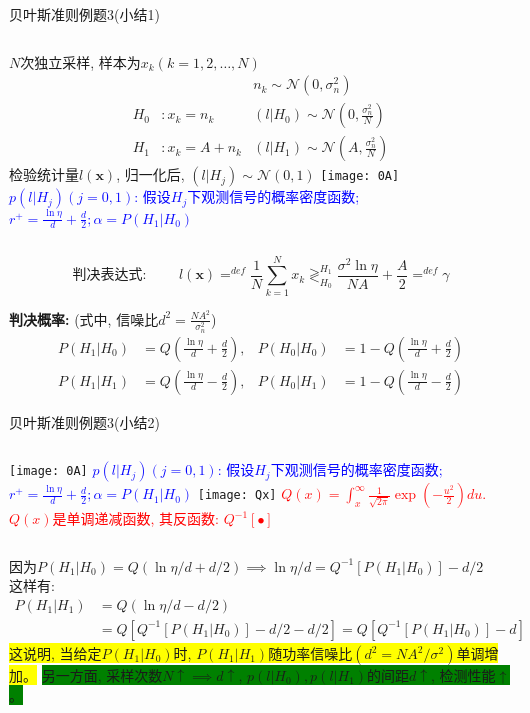 \begin{frame}[shrink]{贝叶斯准则例题3(小结1)}
\begin{columns}
	$N$次独立采样, 样本为$x_k(k=1,2,\dots,N)$
	\begin{align*}
	&&n_k\sim\mathcal{N}(0,\sigma_n^2)\\ 
	H_0 &:x_k=n_k   &(l|H_0)\sim\mathcal{N}(0,\frac{\sigma_n^2}{N})\\
	H_1 &:x_k=A+n_k &(l|H_1)\sim\mathcal{N}(A,\frac{\sigma_n^2}{N})
	\end{align*}
	检验统计量$l(\bm{x})$, 归一化后, $(l|H_j)\sim\mathcal{N}(0,1)$
	\texttt{[image: 0A]}\\
	\scriptsize
	\textcolor{blue}{$p(l|H_j)(j=0,1)$: 假设$H_j$下观测信号的概率密度函数; $r^+=\frac{\ln\eta}{d}+\frac{d}{2}; \alpha=P(H_1|H_0)$}
\end{columns}
\[
\textbf{判决表达式: }\qquad l(\bm{x})\mathop{=}^{def}\frac{1}{N}\sum\limits_{k=1}^Nx_k\mathop{\gtrless}_{H_0}^{H_1}\frac{\sigma^2\ln\eta}{NA}+\frac{A}{2}\mathop{=}^{def}\gamma
\]

\textbf{判决概率:} (式中, 信噪比$d^2=\frac{NA^2}{\sigma_n^2}$)
\begin{align*}
P(H_1|H_0)&=Q\left(\frac{\ln\eta}{d}+\frac{d}{2}\right), &P(H_0|H_0)&=1-Q\left(\frac{\ln\eta}{d}+\frac{d}{2}\right)\\
P(H_1|H_1)&=Q\left(\frac{\ln\eta}{d}-\frac{d}{2}\right),
&P(H_0|H_1)&=1-Q\left(\frac{\ln\eta}{d}-\frac{d}{2}\right)
\end{align*}
\end{frame}

\begin{frame}{贝叶斯准则例题3(小结2)}
\begin{columns}
	\texttt{[image: 0A]}
	\scriptsize
	\textcolor{blue}{$p(l|H_j)(j=0,1)$: 假设$H_j$下观测信号的概率密度函数; $r^+=\frac{\ln\eta}{d}+\frac{d}{2}; \alpha=P(H_1|H_0)$}
	\texttt{[image: Qx]}
	\scriptsize
	\textcolor{red}{$Q(x)=\int_{x}^{\infty}\frac{1}{\sqrt{2\pi}}\exp(-\frac{u^2}{2})du$.}\\
	\textcolor{red}{$Q(x)$是单调递减函数, 其反函数: $Q^{-1}[\bullet]$}
\end{columns}

\bigskip

因为$P(H_1|H_0)=Q(\ln\eta/d+d/2) \implies \ln\eta/d=Q^{-1}[P(H_1|H_0)]-d/2$\\
这样有:
\begin{align*}
P(H_1|H_1)&=Q\left(\ln\eta/d-d/2\right)\\
&=Q[Q^{-1}[P(H_1|H_0)]-d/2-d/2]=Q[Q^{-1}[P(H_1|H_0)]-d]
\end{align*}
\colorbox{yellow}{这说明, 当给定$P(H_1|H_0)$时, $P(H_1|H_1)$随功率信噪比$(d^2=NA^2/\sigma^2)$单调增加。} 
\colorbox{green}{另一方面, 采样次数$N\uparrow\implies d\uparrow$, $p(l|H_0),p(l|H_1)$的间距$d\uparrow$,  检测性能$\uparrow$。} 
\end{frame}

